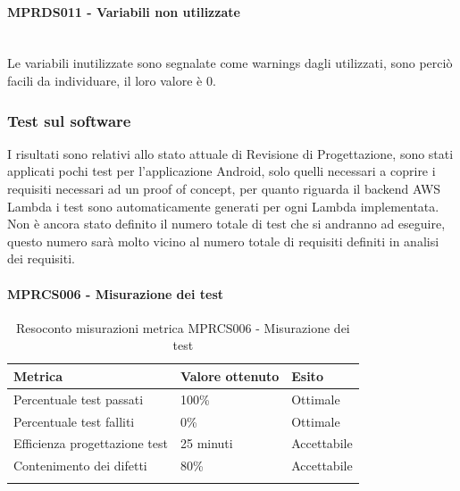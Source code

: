 \paragraph{MPRDS011 - Variabili non utilizzate}\mbox{}\\[0.4cm]
Le variabili inutilizzate sono segnalate come warnings dagli  utilizzati, sono perciò facili da individuare, il loro valore è 0.
\subsubsection{Test sul software}
I risultati sono relativi allo stato attuale di Revisione di Progettazione, sono stati applicati pochi test per l'applicazione Android, solo quelli necessari a coprire i requisiti necessari ad un proof of concept, per quanto riguarda il backend AWS Lambda i test sono automaticamente generati per ogni Lambda implementata. Non è ancora stato definito il numero totale di test che si andranno ad eseguire, questo numero sarà molto vicino al numero totale di requisiti definiti in analisi dei requisiti.
\paragraph{MPRCS006 - Misurazione dei test}
\begin{center}
	\centering
	\renewcommand{\arraystretch}{1.5}
	\begin{longtable}{  p{5cm}  p{5cm} p{3cm}  }
		\rowcolor{tableHeadYellow}
		\textbf{Metrica}   & \textbf{Valore ottenuto} & \textbf{Esito} \\ 
		\endhead
		Percentuale test passati     & 100\%  & Ottimale \\
		Percentuale test falliti     & 0\% & Ottimale \\
		Efficienza progettazione test    & 25 minuti & Accettabile \\
		Contenimento dei difetti    & 80\% & Accettabile \\
		\rowcolor{white}
		\caption{Resoconto misurazioni metrica MPRCS006 - Misurazione dei test}
	\end{longtable}
\end{center}
\clearpage
